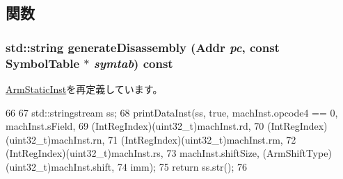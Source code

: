 \subsection{関数}
\hypertarget{classArmISA_1_1PredImmOp_a95d323a22a5f07e14d6b4c9385a91896}{
\subsubsection[{generateDisassembly}]{\setlength{\rightskip}{0pt plus 5cm}std::string generateDisassembly ({\bf Addr} {\em pc}, \/  const SymbolTable $\ast$ {\em symtab}) const}}
\label{classArmISA_1_1PredImmOp_a95d323a22a5f07e14d6b4c9385a91896}


\hyperlink{classArmISA_1_1ArmStaticInst_a95d323a22a5f07e14d6b4c9385a91896}{ArmStaticInst}を再定義しています。


\begin{DoxyCode}
66 {
67     std::stringstream ss;
68     printDataInst(ss, true, machInst.opcode4 == 0, machInst.sField,
69             (IntRegIndex)(uint32_t)machInst.rd,
70             (IntRegIndex)(uint32_t)machInst.rn,
71             (IntRegIndex)(uint32_t)machInst.rm,
72             (IntRegIndex)(uint32_t)machInst.rs,
73             machInst.shiftSize, (ArmShiftType)(uint32_t)machInst.shift,
74             imm);
75     return ss.str();
76 }
\end{DoxyCode}


